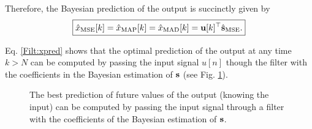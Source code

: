 Therefore, the Bayesian prediction of the output is succinctly given by
%
\begin{equation}
\boxed{
\hat{x}_{\text{MSE} }[k] = \hat{x}_{\text{MAP} }[k] 
                         = \hat{x}_{\text{MAD} }[k]
                         = {\mathbf u}[k]^\top\hat{{\mathbf s}}_\text{MSE}.}
\label{Filt:xpred}
\end{equation}

Eq. \eqref{Filt:xpred} shows that the optimal prediction of the output at any time $k>N$ can be computed by passing the input signal $u[n]$ though the filter with the coefficients in the Bayesian estimation of ${\mathbf s}$ (see Fig. \ref{fig:linear_filter2}).

\begin{figure}[htb]  %
    \centering
\caption{The best prediction of future values of the output (knowing the input) can be computed by passing the input signal through a filter with the coefficients of the Bayesian estimation of ${\mathbf s}$.}
\label{fig:linear_filter2}
\end{figure}



